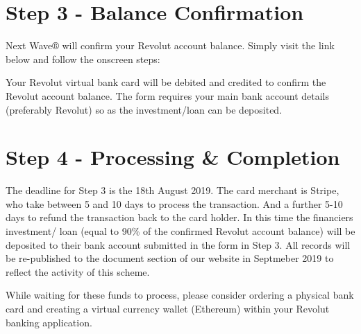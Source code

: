 \documentclass[letterpaper,10pt,openany,oneside,english]{sphinxmanual}
\begin{document}
\section{Step 3 - Balance Confirmation}
\label{\detokenize{getstarted:step-3-balance-confirmation}}
Next Wave® will confirm your Revolut account balance.
Simply visit the link below and follow the onscreen steps: 

Your Revolut virtual bank card will be debited and credited to confirm the Revolut account balance.
The form requires your main bank account details (preferably Revolut) so as the investment/loan can be deposited.


\section{Step 4 - Processing \& Completion}
\label{\detokenize{getstarted:step-4-processing-completion}}
The deadline for Step 3 is the 18th August 2019. The card merchant is Stripe, who take between 5 and 10 days to process the transaction. And a further 5-10 days to refund the transaction back to the card holder. In this time the financiers investment/ loan (equal to 90\% of the confirmed Revolut account balance) will be deposited to their bank account submitted in the form in Step 3. All records will be re-published to the document section of our website in Septmeber 2019 to reflect the activity of this scheme.

While waiting for these funds to process, please consider ordering a physical bank card and creating a virtual currency wallet (Ethereum) within your Revolut banking application.
\end{document}
